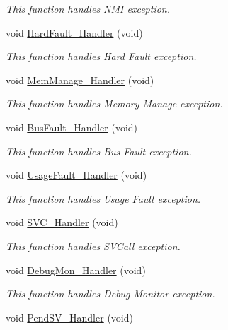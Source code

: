 \begin{DoxyCompactItemize}
\begin{DoxyCompactList}\small\item\em This function handles N\-M\-I exception. \end{DoxyCompactList}\item 
void \hyperlink{group___p_w_r___s_t_o_p_ga2bffc10d5bd4106753b7c30e86903bea}{Hard\-Fault\-\_\-\-Handler} (void)
\begin{DoxyCompactList}\small\item\em This function handles Hard Fault exception. \end{DoxyCompactList}\item 
void \hyperlink{group___p_w_r___s_t_o_p_ga3150f74512510287a942624aa9b44cc5}{Mem\-Manage\-\_\-\-Handler} (void)
\begin{DoxyCompactList}\small\item\em This function handles Memory Manage exception. \end{DoxyCompactList}\item 
void \hyperlink{group___p_w_r___s_t_o_p_ga850cefb17a977292ae5eb4cafa9976c3}{Bus\-Fault\-\_\-\-Handler} (void)
\begin{DoxyCompactList}\small\item\em This function handles Bus Fault exception. \end{DoxyCompactList}\item 
void \hyperlink{group___p_w_r___s_t_o_p_ga1d98923de2ed6b7309b66f9ba2971647}{Usage\-Fault\-\_\-\-Handler} (void)
\begin{DoxyCompactList}\small\item\em This function handles Usage Fault exception. \end{DoxyCompactList}\item 
void \hyperlink{group___p_w_r___s_t_o_p_ga3e5ddb3df0d62f2dc357e64a3f04a6ce}{S\-V\-C\-\_\-\-Handler} (void)
\begin{DoxyCompactList}\small\item\em This function handles S\-V\-Call exception. \end{DoxyCompactList}\item 
void \hyperlink{group___p_w_r___s_t_o_p_gadbdfb05858cc36fc520974df37ec3cb0}{Debug\-Mon\-\_\-\-Handler} (void)
\begin{DoxyCompactList}\small\item\em This function handles Debug Monitor exception. \end{DoxyCompactList}\item 
void \hyperlink{group___p_w_r___s_t_o_p_ga6303e1f258cbdc1f970ce579cc015623}{Pend\-S\-V\-\_\-\-Handler} (void)

\end{DoxyCompactItemize}
